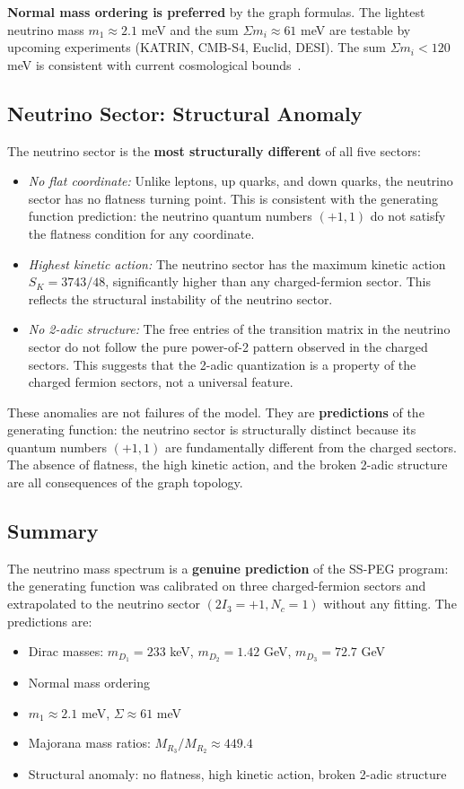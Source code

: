 \textbf{Normal mass ordering is preferred} by the graph formulas. The lightest neutrino mass $m_1 \approx 2.1$ meV and the sum $\Sigma m_i \approx 61$ meV are testable by upcoming experiments (KATRIN, CMB-S4, Euclid, DESI). The sum $\Sigma m_i < 120$ meV is consistent with current cosmological bounds~\cite{nufit52}.

\subsection{Neutrino Sector: Structural Anomaly}\label{sec:neutrino_anomaly}

The neutrino sector is the \textbf{most structurally different} of all five sectors:
\begin{itemize}
\item \textit{No flat coordinate:} Unlike leptons, up quarks, and down quarks, the neutrino sector has no flatness turning point. This is consistent with the generating function prediction: the neutrino quantum numbers $(+1, 1)$ do not satisfy the flatness condition for any coordinate.
\item \textit{Highest kinetic action:} The neutrino sector has the maximum kinetic action $S_K = 3743/48$, significantly higher than any charged-fermion sector. This reflects the structural instability of the neutrino sector.
\item \textit{No 2-adic structure:} The free entries of the transition matrix in the neutrino sector do not follow the pure power-of-2 pattern observed in the charged sectors. This suggests that the 2-adic quantization is a property of the charged fermion sectors, not a universal feature.
\end{itemize}

These anomalies are not failures of the model. They are \textbf{predictions} of the generating function: the neutrino sector is structurally distinct because its quantum numbers $(+1, 1)$ are fundamentally different from the charged sectors. The absence of flatness, the high kinetic action, and the broken 2-adic structure are all consequences of the graph topology.

\subsection{Summary}\label{sec:neutrino_summary}

The neutrino mass spectrum is a \textbf{genuine prediction} of the SS-PEG program: the generating function was calibrated on three charged-fermion sectors and extrapolated to the neutrino sector $(2I_3 = +1, N_c = 1)$ without any fitting. The predictions are:
\begin{itemize}
\item Dirac masses: $m_{D_1} = 233$ keV, $m_{D_2} = 1.42$ GeV, $m_{D_3} = 72.7$ GeV
\item Normal mass ordering
\item $m_1 \approx 2.1$ meV, $\Sigma \approx 61$ meV
\item Majorana mass ratios: $M_{R_3}/M_{R_2} \approx 449.4$
\item Structural anomaly: no flatness, high kinetic action, broken 2-adic structure
\end{itemize}

